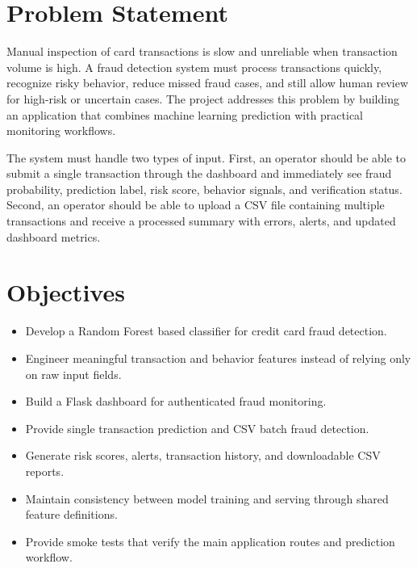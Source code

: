 \documentclass[12pt,a4paper]{report}
\begin{document}
\section{Problem Statement}
Manual inspection of card transactions is slow and unreliable when transaction volume is high. A fraud detection system must process transactions quickly, recognize risky behavior, reduce missed fraud cases, and still allow human review for high-risk or uncertain cases. The project addresses this problem by building an application that combines machine learning prediction with practical monitoring workflows.

The system must handle two types of input. First, an operator should be able to submit a single transaction through the dashboard and immediately see fraud probability, prediction label, risk score, behavior signals, and verification status. Second, an operator should be able to upload a CSV file containing multiple transactions and receive a processed summary with errors, alerts, and updated dashboard metrics.

\section{Objectives}
\begin{itemize}
    \item Develop a Random Forest based classifier for credit card fraud detection.
    \item Engineer meaningful transaction and behavior features instead of relying only on raw input fields.
    \item Build a Flask dashboard for authenticated fraud monitoring.
    \item Provide single transaction prediction and CSV batch fraud detection.
    \item Generate risk scores, alerts, transaction history, and downloadable CSV reports.
    \item Maintain consistency between model training and serving through shared feature definitions.
    \item Provide smoke tests that verify the main application routes and prediction workflow.
\end{itemize}
\end{document}
